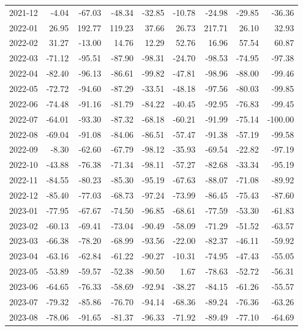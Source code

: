 \begin{table}[ht]
\begin{tabular}{lrrrrrrrr}
  2021-12 & -4.04 & -67.03 & -48.34 & -32.85 & -10.78 & -24.98 & -29.85 & -36.36 \\ 
  2022-01 & 26.95 & 192.77 & 119.23 & 37.66 & 26.73 & 217.71 & 26.10 & 32.93 \\ 
  2022-02 & 31.27 & -13.00 & 14.76 & 12.29 & 52.76 & 16.96 & 57.54 & 60.87 \\ 
  2022-03 & -71.12 & -95.51 & -87.90 & -98.31 & -24.70 & -98.53 & -74.95 & -97.38 \\ 
  2022-04 & -82.40 & -96.13 & -86.61 & -99.82 & -47.81 & -98.96 & -88.00 & -99.46 \\ 
  2022-05 & -72.72 & -94.60 & -87.29 & -33.51 & -48.18 & -97.56 & -80.03 & -99.85 \\ 
  2022-06 & -74.48 & -91.16 & -81.79 & -84.22 & -40.45 & -92.95 & -76.83 & -99.45 \\ 
  2022-07 & -64.01 & -93.30 & -87.32 & -68.18 & -60.21 & -91.99 & -75.14 & -100.00 \\ 
  2022-08 & -69.04 & -91.08 & -84.06 & -86.51 & -57.47 & -91.38 & -57.19 & -99.58 \\ 
  2022-09 & -8.30 & -62.60 & -67.79 & -98.12 & -35.93 & -69.54 & -22.82 & -97.19 \\ 
  2022-10 & -43.88 & -76.38 & -71.34 & -98.11 & -57.27 & -82.68 & -33.34 & -95.19 \\ 
  2022-11 & -84.55 & -80.23 & -85.30 & -95.19 & -67.63 & -88.07 & -71.08 & -89.92 \\ 
  2022-12 & -85.40 & -77.03 & -68.73 & -97.24 & -73.99 & -86.45 & -75.43 & -87.60 \\ 
  2023-01 & -77.95 & -67.67 & -74.50 & -96.85 & -68.61 & -77.59 & -53.30 & -61.83 \\ 
  2023-02 & -60.13 & -69.41 & -73.04 & -90.49 & -58.09 & -71.29 & -51.52 & -63.57 \\ 
  2023-03 & -66.38 & -78.20 & -68.99 & -93.56 & -22.00 & -82.37 & -46.11 & -59.92 \\ 
  2023-04 & -63.16 & -62.84 & -61.22 & -90.27 & -10.31 & -74.95 & -47.43 & -55.05 \\ 
  2023-05 & -53.89 & -59.57 & -52.38 & -90.50 & 1.67 & -78.63 & -52.72 & -56.31 \\ 
  2023-06 & -64.65 & -76.33 & -58.69 & -92.94 & -38.27 & -84.15 & -61.26 & -55.57 \\ 
  2023-07 & -79.32 & -85.86 & -76.70 & -94.14 & -68.36 & -89.24 & -76.36 & -63.26 \\ 
  2023-08 & -78.06 & -91.65 & -81.37 & -96.33 & -71.92 & -89.49 & -77.10 & -64.69 \\ 

\end{tabular}
\end{table}
